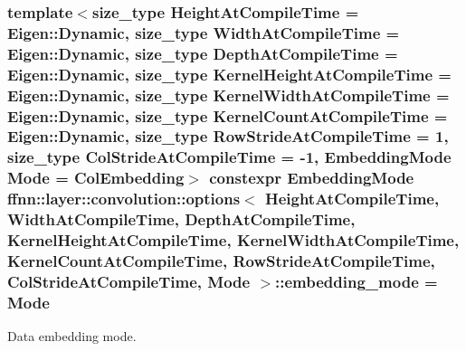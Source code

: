 \hypertarget{structffnn_1_1layer_1_1convolution_1_1options_a7befeba5b65e0442750d11713cedc816}{
\subsubsection[{embedding\-\_\-mode}]{\setlength{\rightskip}{0pt plus 5cm}template$<$size\-\_\-type Height\-At\-Compile\-Time = Eigen\-::\-Dynamic, size\-\_\-type Width\-At\-Compile\-Time = Eigen\-::\-Dynamic, size\-\_\-type Depth\-At\-Compile\-Time = Eigen\-::\-Dynamic, size\-\_\-type Kernel\-Height\-At\-Compile\-Time = Eigen\-::\-Dynamic, size\-\_\-type Kernel\-Width\-At\-Compile\-Time = Eigen\-::\-Dynamic, size\-\_\-type Kernel\-Count\-At\-Compile\-Time = Eigen\-::\-Dynamic, size\-\_\-type Row\-Stride\-At\-Compile\-Time = 1, size\-\_\-type Col\-Stride\-At\-Compile\-Time = -\/1, Embedding\-Mode Mode = Col\-Embedding$>$ constexpr {\bf Embedding\-Mode} {\bf ffnn\-::layer\-::convolution\-::options}$<$ Height\-At\-Compile\-Time, Width\-At\-Compile\-Time, Depth\-At\-Compile\-Time, Kernel\-Height\-At\-Compile\-Time, Kernel\-Width\-At\-Compile\-Time, Kernel\-Count\-At\-Compile\-Time, Row\-Stride\-At\-Compile\-Time, Col\-Stride\-At\-Compile\-Time, Mode $>$\-::embedding\-\_\-mode = Mode\hspace{0.3cm}{\ttfamily [static]}}}\label{structffnn_1_1layer_1_1convolution_1_1options_a7befeba5b65e0442750d11713cedc816}


Data embedding mode. 

